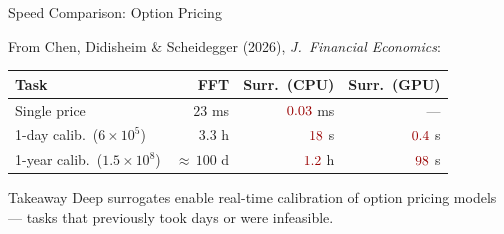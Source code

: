 \documentclass[aspectratio=169,11pt]{beamer}
\newcommand{\emphc}[1]{\textcolor{harvardcrimson}{#1}}
\begin{document}
\begin{frame}{Speed Comparison: Option Pricing}
\begin{center}
{\footnotesize From Chen, Didisheim \& Scheidegger (2026), \emph{J.\ Financial Economics}:}

\vspace{0.2cm}
\small
\begin{tabular}{l r r r}
\toprule
\textbf{Task} & \textbf{FFT} & \textbf{Surr.\ (CPU)} & \textbf{Surr.\ (GPU)} \\
\midrule
Single price & $23$ ms & $\emphc{0.03}$ ms & --- \\
1-day calib.\ ($6\!\times\!10^5$) & $3.3$ h & $\emphc{18}$ s & $\emphc{0.4}$ s\\
1-year calib.\ ($1.5\!\times\!10^8$) & ${\approx}\,100$ d & $\emphc{1.2}$ h & $\emphc{98}$ s\\
\bottomrule
\end{tabular}
\end{center}

\vspace{0.3cm}
\begin{alertblock}{Takeaway}
Deep surrogates enable \emphc{real-time calibration} of option pricing models --- tasks that previously took days or were infeasible.
\end{alertblock}
\end{frame}
\end{document}
